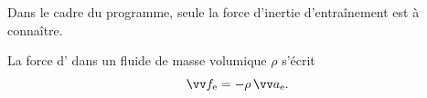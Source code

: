 \documentclass[12pt,fancy]{cours}
\begin{document}
Dans le cadre du programme, seule la force d'inertie d'entraînement est à connaître.
\begin{theorem}\label{form:}
La force d' dans un fluide de masse volumique $\rho$ s'écrit
\begin{equation*}
\Vec{f_{\rm e}} = -\rho \,\Vec{a_{\rm e}}.
\end{equation*}
\end{theorem}
\end{document}
